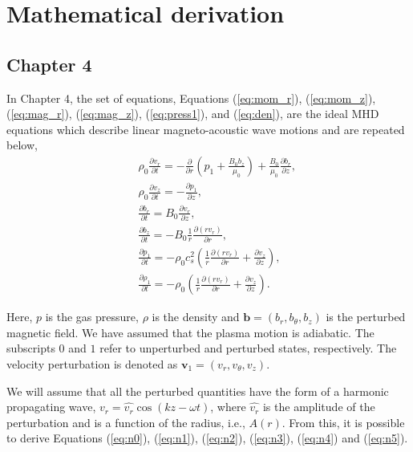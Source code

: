 \chapter{Mathematical derivation} 

\section*{Chapter 4}

In Chapter 4, the set of equations, Equations (\ref{eq:mom_r}), (\ref{eq:mom_z}), (\ref{eq:mag_r}), (\ref{eq:mag_z}), (\ref{eq:press1}), and (\ref{eq:den}), are the ideal MHD equations which describe linear magneto-acoustic wave motions and are repeated below,
\begin{align}
    &&\rho_0 \frac{\partial v_r}{\partial t}=-\frac{\partial}{\partial r}
    \left(p_1+\frac{B_0b_z}{\mu_0}\right)+\frac{B_0}{\mu_0}\frac{\partial b_r}{\partial z},
    \label{eq:apen_mom_r}\\
    &&\rho_0\frac{\partial v_z}{\partial t}=-\frac{\partial p_1}{\partial z},
    \label{eq:apen_mom_z}\\
    &&\frac{\partial b_r}{\partial t}=B_0\frac{\partial v_r}{\partial z},
    \label{eq:apen_mag_r}\\
    &&\frac{\partial b_z}{\partial t}=-B_0\frac{1}{r}\frac{\partial (rv_r)}{\partial r},
    \label{eq:apen_mag_z}\\
    &&\frac{\partial p_1}{\partial t}=-\rho_0
    c_s^2\left(\frac{1}{r}\frac{\partial(rv_r)}{\partial r}+\frac{\partial v_z}{\partial z}\right),
    \label{eq:apen_press1}\\
    &&\frac{\partial \rho_1}{\partial t}=-\rho_0\left(\frac{1}{r}\frac{\partial (rv_r)}{\partial r}+\frac{\partial v_z}{\partial z}\right).
    \label{eq:apen_den}
\end{align}

Here, $p$ is the gas pressure, $\rho$ is the density and $\textbf{b} = (b_r,b_{\theta},b_z)$ is the perturbed magnetic field.
We have assumed that the plasma motion is adiabatic.
The subscripts $0$ and $1$ refer to unperturbed and perturbed states, respectively.
The velocity perturbation is denoted as $\textbf{v}_1= (v_r, v_{\theta}, v_z)$.

We will assume that all the perturbed quantities have the form of a harmonic propagating wave, $v_r=\hat{v_r}\cos(kz-\omega t)$, where $\hat{v_r}$ is the amplitude of the perturbation and is a function of the radius, i.e., $A(r)$.
From this, it is possible to derive Equations (\ref{eq:n0}), (\ref{eq:n1}), (\ref{eq:n2}), (\ref{eq:n3}), (\ref{eq:n4}) and (\ref{eq:n5}).

